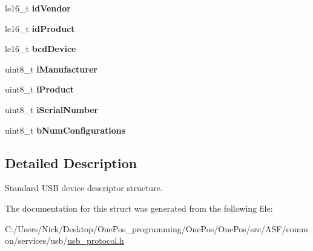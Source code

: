 \begin{DoxyCompactItemize}
\item 
\hypertarget{structusb__dev__desc__t_a929b87a9372d2fb886cdfa9ac50108df}{le16\-\_\-t {\bfseries id\-Vendor}}\label{structusb__dev__desc__t_a929b87a9372d2fb886cdfa9ac50108df}

\item 
\hypertarget{structusb__dev__desc__t_a5102924a87c42fb7d962e6f51df913be}{le16\-\_\-t {\bfseries id\-Product}}\label{structusb__dev__desc__t_a5102924a87c42fb7d962e6f51df913be}

\item 
\hypertarget{structusb__dev__desc__t_ace438955df22cd6527b8f1d543c41aed}{le16\-\_\-t {\bfseries bcd\-Device}}\label{structusb__dev__desc__t_ace438955df22cd6527b8f1d543c41aed}

\item 
\hypertarget{structusb__dev__desc__t_ac981257b49a80b33109a3c9221e222ef}{uint8\-\_\-t {\bfseries i\-Manufacturer}}\label{structusb__dev__desc__t_ac981257b49a80b33109a3c9221e222ef}

\item 
\hypertarget{structusb__dev__desc__t_a2b7a0e3e8fc29da7fb47dbeb507556ad}{uint8\-\_\-t {\bfseries i\-Product}}\label{structusb__dev__desc__t_a2b7a0e3e8fc29da7fb47dbeb507556ad}

\item 
\hypertarget{structusb__dev__desc__t_aada14a1b1dd2a396544624c21ed84291}{uint8\-\_\-t {\bfseries i\-Serial\-Number}}\label{structusb__dev__desc__t_aada14a1b1dd2a396544624c21ed84291}

\item 
\hypertarget{structusb__dev__desc__t_ae1e58f9b7987e22fde8306ad4a3e50a8}{uint8\-\_\-t {\bfseries b\-Num\-Configurations}}\label{structusb__dev__desc__t_ae1e58f9b7987e22fde8306ad4a3e50a8}

\end{DoxyCompactItemize}


\subsection{Detailed Description}
Standard U\-S\-B device descriptor structure. 

The documentation for this struct was generated from the following file\-:\begin{DoxyCompactItemize}
\item 
C\-:/\-Users/\-Nick/\-Desktop/\-One\-Pos\-\_\-programming/\-One\-Pos/\-One\-Pos/src/\-A\-S\-F/common/services/usb/\hyperlink{usb__protocol_8h}{usb\-\_\-protocol.\-h}\end{DoxyCompactItemize}
